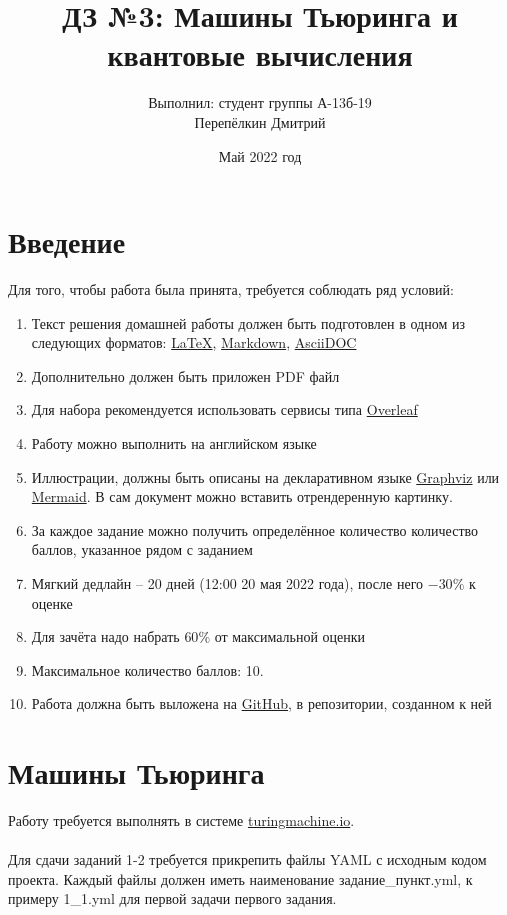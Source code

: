\documentclass{article}
\title{ДЗ №3: Машины Тьюринга и квантовые вычисления}
\author{Выполнил: студент группы А-13б-19\\ Перепёлкин Дмитрий}
\date{Май 2022 год}
\begin{document}
\maketitle

\section{Введение}

Для того, чтобы работа была принята, требуется соблюдать ряд условий:

\begin{enumerate}
    \item Текст решения домашней работы должен быть подготовлен в одном из следующих форматов: \href{https://www.latex-project.org/}{\LaTeX}, \href{https://en.wikipedia.org/wiki/Markdown}{Markdown}, \href{https://asciidoc-py.github.io/index.html}{AsciiDOC}
    \item Дополнительно должен быть приложен PDF файл
    \item Для набора рекомендуется использовать сервисы типа \href{https://www.overleaf.com}{Overleaf}
    \item Работу можно выполнить на английском языке
    \item Иллюстрации, должны быть описаны на декларативном языке \href{https://graphviz.org/}{Graphviz} или \href{https://mermaid-js.github.io/mermaid/#/}{Mermaid}. В сам документ можно вставить отрендеренную картинку.
    \item За каждое задание можно получить определённое количество количество баллов, указанное рядом с заданием
    \item Мягкий дедлайн -- 20 дней (12:00 20 мая 2022 года), после него $-30\%$ к оценке
    \item Для зачёта надо набрать $60\%$ от максимальной оценки
    \item Максимальное количество баллов: 10.
    \item Работа должна быть выложена на \href{https://github.com/}{GitHub}, в репозитории, созданном к ней
\end{enumerate}

\section{Машины Тьюринга}

Работу требуется выполнять в системе \url{turingmachine.io}. \\\\
Для сдачи заданий 1-2 требуется прикрепить файлы YAML с исходным кодом проекта. Каждый файлы должен иметь наименование задание\_пункт.yml, к примеру 1\_1.yml для первой задачи первого задания. \\\\
\end{document}
